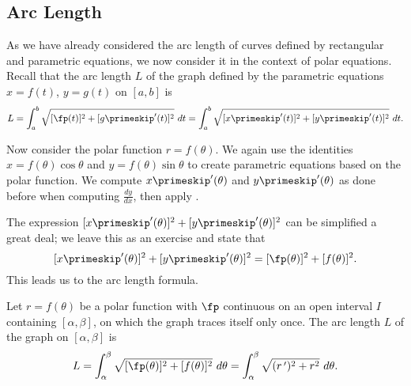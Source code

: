 \subsection*{Arc Length}

As we have already considered the arc length of curves defined by rectangular and parametric equations, we now consider it in the context of polar equations. Recall that the arc length $L$ of the graph defined by the parametric equations $x=f(t)$, $y=g(t)$ on $[a,b]$ is
\begin{equation}L = \int_a^b \sqrt{[\fp(t)]^2 + [g\primeskip'(t)]^2}\ dt = \int_a^b \sqrt{[x\primeskip'(t)]^2+[y\primeskip'(t)]^2}\ dt.\label{eq:polar_arclength}\end{equation}

Now consider the polar function $r=f(\theta)$. We again use the identities $x=f(\theta)\cos\theta$ and $y=f(\theta)\sin\theta$ to create parametric equations based on the polar function. We compute $x\primeskip'(\theta)$ and $y\primeskip'(\theta)$ as done before when computing $\frac{dy}{dx}$, then apply .

The expression $[x\primeskip'(\theta)]^2+[y\primeskip'(\theta)]^2$ can be simplified a great deal; we leave this as an exercise and state that $$[x\primeskip'(\theta)]^2+[y\primeskip'(\theta)]^2 = [\fp(\theta)]^2+[f(\theta)]^2.$$ This leads us to the  arc length formula.

{Let  $r=f(\theta)$ be a polar function with $\fp$ continuous on an open interval $I$ containing $[\alpha,\beta]$, on which the graph traces itself only once. The arc length $L$ of the graph on $[\alpha,\beta]$ is
$$L = \int_\alpha^\beta \sqrt{[\fp(\theta)]^2+[f(\theta)]^2}\ d\theta = \int_\alpha^\beta\sqrt{(r\,')^2+ r^2}\ d\theta.$$
}

